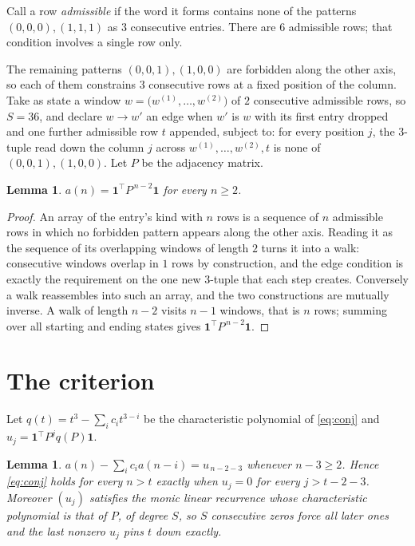 \documentclass[11pt,a4paper]{article}
\theoremstyle{plain}
\newtheorem{lemma}[theorem]{Lemma}
\theoremstyle{definition}
\begin{document}
Call a row \emph{admissible} if the word it forms contains none of the patterns
$(0,0,0), (1,1,1)$ as $3$ consecutive entries. There are $6$ admissible rows; that condition
involves a single row only.

The remaining patterns $(0,0,1), (1,0,0)$ are forbidden along the other axis, so each of them
constrains $3$ consecutive rows at a fixed position of the column. Take as state a
window $w=\bigl(w^{(1)},\dots,w^{(2)}\bigr)$ of $2$ consecutive admissible
rows, so $S=36$, and declare $w\to w'$ an edge when $w'$ is $w$ with its first entry
dropped and one further admissible row $t$ appended, subject to: for every position
$j$, the $3$-tuple read down the column $j$ across $w^{(1)},\dots,w^{(2)},t$
is none of $(0,0,1), (1,0,0)$. Let $P$ be the adjacency matrix.

\begin{lemma}\label{lem:walk}
$a(n)=\mathbf{1}^{\!\top}P^{\,n-2}\mathbf{1}$ for every $n\ge2$.
\end{lemma}

\begin{proof}
An array of the entry's kind with $n$ rows is a sequence of $n$ admissible rows in
which no forbidden pattern appears along the other axis. Reading it as the sequence of its
overlapping windows of length $2$ turns it into a walk: consecutive windows overlap in
$1$ rows by construction, and the edge condition is exactly the requirement on the one
new $3$-tuple that each step creates. Conversely a walk reassembles into such an array,
and the two constructions are mutually inverse. A walk of length $n-2$ visits $n-1$
windows, that is $n$ rows; summing over all starting and ending states gives
$\mathbf{1}^{\!\top}P^{\,n-2}\mathbf{1}$.
\end{proof}

\section{The criterion}

Let $q(t)=t^{3}-\sum_i c_i t^{3-i}$ be the characteristic polynomial of
\eqref{eq:conj} and $u_j=\mathbf{1}^{\!\top}P^{j}q(P)\mathbf{1}$.

\begin{lemma}\label{lem:crit}
$a(n)-\sum_i c_i a(n-i)=u_{\,n-2-3}$ whenever $n-3\ge2$. Hence
\eqref{eq:conj} holds for every $n>t$ exactly when $u_j=0$ for every
$j>t-2-3$. Moreover $(u_j)$ satisfies the monic linear recurrence whose
characteristic polynomial is that of $P$, of degree $S$, so $S$ consecutive zeros force all
later ones and the last nonzero $u_j$ pins $t$ down exactly.
\end{lemma}
\end{document}
